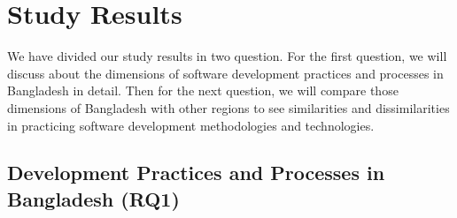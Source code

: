 \section{Study Results}
\label{study_results}




We have divided our study results in two question. For the first question, we will discuss about the dimensions of software development practices and processes in Bangladesh in detail. Then for the next question, we will compare those dimensions of Bangladesh with other regions to see similarities and dissimilarities in practicing software development methodologies and technologies.

\subsection{Development Practices and Processes in Bangladesh (RQ1)}
\label{RQ1}

